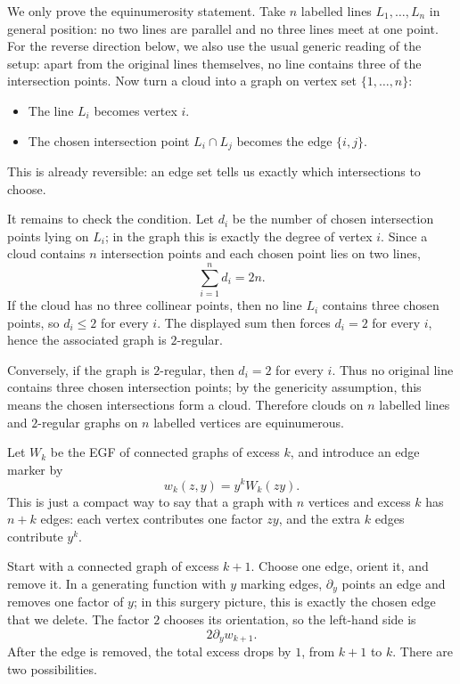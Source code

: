 We only prove the equinumerosity statement. Take $n$ labelled lines
$L_{1},\ldots,L_{n}$ in general position: no two lines are parallel and no three lines meet at
one point. For the reverse direction below, we also use the usual generic reading of the setup:
apart from the original lines themselves, no line contains three of the intersection points.
Now turn a cloud into a graph on vertex set $\{1,\ldots,n\}$:
\begin{itemize}
    \item The line $L_i$ becomes vertex $i$.
    \item The chosen intersection point $L_i \cap L_j$ becomes the edge $\{i,j\}$.
\end{itemize}
This is already reversible: an edge set tells us exactly which intersections to choose.

It remains to check the condition. Let $d_i$ be the number of chosen intersection points lying
on $L_i$; in the graph this is exactly the degree of vertex $i$. Since a cloud contains $n$
intersection points and each chosen point lies on two lines,
\begin{equation*}
    \sum_{i = 1}^{n} d_i = 2n.
\end{equation*}
If the cloud has no three collinear points, then no line $L_i$ contains three chosen points, so
$d_i \leq 2$ for every $i$. The displayed sum then forces $d_i = 2$ for every $i$, hence the
associated graph is $2$-regular.

Conversely, if the graph is $2$-regular, then $d_i = 2$ for every $i$. Thus no original line
contains three chosen intersection points; by the genericity assumption, this means the
chosen intersections form a cloud. Therefore clouds on $n$ labelled lines and $2$-regular
graphs on $n$ labelled vertices are equinumerous.


Let $W_k$ be the EGF of connected graphs of excess $k$, and introduce an edge marker by
\begin{equation*}
    w_k(z,y) = y^k W_k(zy).
\end{equation*}
This is just a compact way to say that a graph with $n$ vertices and excess $k$ has
$n+k$ edges: each vertex contributes one factor $zy$, and the extra $k$ edges contribute
$y^k$.

Start with a connected graph of excess $k+1$. Choose one edge, orient it, and remove it.
In a generating function with $y$ marking edges, $\partial_y$ points an edge and removes one
factor of $y$; in this surgery picture, this is exactly the chosen edge that we delete. The
factor $2$ chooses its orientation, so the left-hand side is
\begin{equation*}
    2\partial_y w_{k+1}.
\end{equation*}
After the edge is removed, the total excess drops by $1$, from $k+1$ to $k$. There are two
possibilities.

